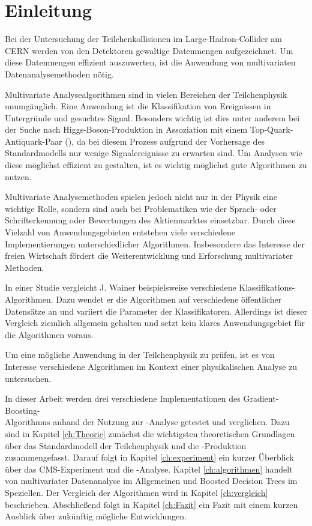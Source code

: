 
\chapter{Einleitung}
\label{ch:Einleitung}

{}

Bei der Untersuchung der Teilchenkollisionen im Large-Hadron-Collider am CERN werden von den Detektoren gewaltige Datenmengen aufgezeichnet. Um diese Datenmengen effizient auszuwerten, ist die Anwendung von multivariaten Datenanalysemethoden n\"otig.

Multivariate Analysealgorithmen sind in vielen Bereichen der Teilchenphysik unumg\"anglich. Eine Anwendung ist die Klassifikation von Ereignissen in Untergr\"unde und gesuchtes Signal. Besonders wichtig ist dies unter anderem bei der Suche nach Higgs-Boson-Produktion in Assoziation mit einem Top-Quark-Antiquark-Paar (\ttH), da bei diesem Prozess aufgrund der Vorhersage des Standardmodells nur wenige Signalereignisse zu erwarten sind. Um Analysen wie diese m\"oglichst effizient zu gestalten, ist es wichtig m\"oglichst gute Algorithmen zu nutzen.

Multivariate Analysemethoden spielen jedoch nicht nur in der Physik eine wichtige Rolle, sondern sind auch bei Problematiken wie der Sprach- oder Schrifterkennung oder Bewertungen des Aktienmarktes einsetzbar. Durch diese Vielzahl von Anwendungsgebieten entstehen viele verschiedene Implementierungen unterschiedlicher Algorithmen. Insbesondere das Interesse der freien Wirtschaft f\"ordert die Weiterentwicklung und Erforschung multivariater Methoden.

In einer Studie vergleicht J. Wainer \cite{DBLP:journals/corr/Wainer16} beispielsweise verschiedene Klassifikations-Algorithmen. Dazu wendet er die Algorithmen auf verschiedene \"offentlicher Datens\"atze an und variiert die Parameter der Klassifikatoren. Allerdings ist dieser Vergleich ziemlich allgemein gehalten und setzt kein klares Anwendungsgebiet f\"ur die Algorithmen voraus.

Um eine m\"ogliche Anwendung in der Teilchenphysik zu pr\"ufen, ist es von Interesse verschiedene Algorithmen im Kontext einer physikalischen Analyse zu untersuchen.

In dieser Arbeit werden drei verschiedene Implementationen des Gradient-Boosting-\\Algorithmus anhand der Nutzung zur \ttH-Analyse getestet und verglichen. Dazu sind in Kapitel \ref{ch:Theorie} zun\"achst die wichtigsten theoretischen Grundlagen \"uber das Standardmodell der Teilchenphysik und die \ttH-Produktion zusammengefasst. Darauf folgt in Kapitel \ref{ch:experiment} ein kurzer \"Uberblick \"uber das CMS-Experiment und die \ttH-Analyse. Kapitel \ref{ch:algorithmen} handelt von multivariater Datenanalyse im Allgemeinen und Boosted Decision Trees im Speziellen. Der Vergleich der Algorithmen wird in Kapitel \ref{ch:vergleich} beschrieben. Abschlie\ss end folgt in Kapitel \ref{ch:Fazit} ein Fazit mit einem kurzen Ausblick \"uber zuk\"unftig m\"ogliche Entwicklungen.